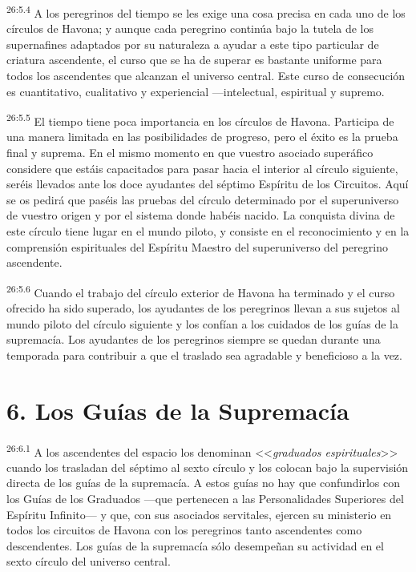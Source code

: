 \par
\textsuperscript{26:5.4} A los peregrinos del tiempo se les exige una cosa precisa en cada uno de los círculos de Havona; y aunque cada peregrino continúa bajo la tutela de los supernafines adaptados por su naturaleza a ayudar a este tipo particular de criatura ascendente, el curso que se ha de superar es bastante uniforme para todos los ascendentes que alcanzan el universo central. Este curso de consecución es cuantitativo, cualitativo y experiencial ---intelectual, espiritual y supremo.

\par
\textsuperscript{26:5.5} El tiempo tiene poca importancia en los círculos de Havona. Participa de una manera limitada en las posibilidades de progreso, pero el éxito es la prueba final y suprema. En el mismo momento en que vuestro asociado superáfico considere que estáis capacitados para pasar hacia el interior al círculo siguiente, seréis llevados ante los doce ayudantes del séptimo Espíritu de los Circuitos. Aquí se os pedirá que paséis las pruebas del círculo determinado por el superuniverso de vuestro origen y por el sistema donde habéis nacido. La conquista divina de este círculo tiene lugar en el mundo piloto, y consiste en el reconocimiento y en la comprensión espirituales del Espíritu Maestro del superuniverso del peregrino ascendente.

\par
\textsuperscript{26:5.6} Cuando el trabajo del círculo exterior de Havona ha terminado y el curso ofrecido ha sido superado, los ayudantes de los peregrinos llevan a sus sujetos al mundo piloto del círculo siguiente y los confían a los cuidados de los guías de la supremacía. Los ayudantes de los peregrinos siempre se quedan durante una temporada para contribuir a que el traslado sea agradable y beneficioso a la vez.

\section*{6. Los Guías de la Supremacía}
\par
\textsuperscript{26:6.1} A los ascendentes del espacio los denominan <<\textit{graduados espirituales}>> cuando los trasladan del séptimo al sexto círculo y los colocan bajo la supervisión directa de los guías de la supremacía. A estos guías no hay que confundirlos con los Guías de los Graduados ---que pertenecen a las Personalidades Superiores del Espíritu Infinito--- y que, con sus asociados servitales, ejercen su ministerio en todos los circuitos de Havona con los peregrinos tanto ascendentes como descendentes. Los guías de la supremacía sólo desempeñan su actividad en el sexto círculo del universo central.

